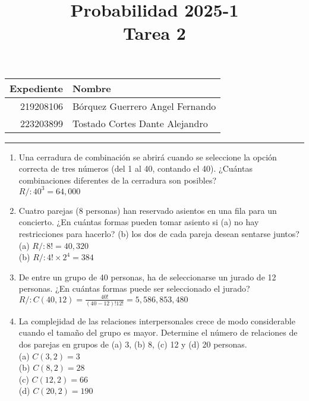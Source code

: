 \documentclass[a4paper, 12pt]{article}
\title{%
  Probabilidad 2025-1 \\
  Tarea 2
}
\begin{document}
\maketitle

\begin{center}
    \begin{tabular}{r|l}
        \textbf{Expediente} & \textbf{Nombre} \\ \hline
        219208106 & Bórquez Guerrero Angel Fernando \\
        223203899 & Tostado Cortes Dante Alejandro \\
    \end{tabular}
\end{center}

\rule{\linewidth}{0.3mm}

\begin{enumerate}
    \item Una cerradura de combinación se abrirá cuando se seleccione la opción correcta de tres números (del 1 al 40, contando el 40). ¿Cuántas combinaciones diferentes de la cerradura son posibles?
    \vspace{0.2cm}
    \\ { \color{azul} $R/: 40^{3} = 64,000$ }

    \vspace{0.5cm}
    \item Cuatro parejas (8 personas) han reservado asientos en una fila para un concierto. ¿En cuántas formas pueden tomar asiento si (a) no hay restricciones para hacerlo? (b) los dos de cada pareja desean sentarse juntos?
    \vspace{0.2cm}
    \\ (a) { \color{azul} $R/: 8! = 40,320$ }
    \\ (b) { \color{azul} $R/: 4! \times 2^{4} = 384$ }
    
    \vspace{0.5cm}
    \item De entre un grupo de 40 personas, ha de seleccionarse un jurado de 12 personas. ¿En cuántas formas puede ser seleccionado el jurado?
    \vspace{0.2cm}
    \\ { \color{azul} $R/: C(40, 12) = \frac{40!}{(40-12)!12!} = 5,586,853,480$ }

    \vspace{0.5cm}
    \item La complejidad de las relaciones interpersonales crece de modo considerable cuando el tamaño del grupo es mayor. Determine el número de relaciones de dos parejas en grupos de (a) 3, (b) 8, (c) 12 y (d) 20 personas.
    \vspace{0.2cm}
    \\ (a) { \color{azul} $C(3, 2) = 3$ }
    \\ (b) { \color{azul} $C(8, 2) = 28$ }
    \\ (c) { \color{azul} $C(12, 2) = 66$ }
    \\ (d) { \color{azul} $C(20, 2) = 190$ }


\end{enumerate}
\end{document}
